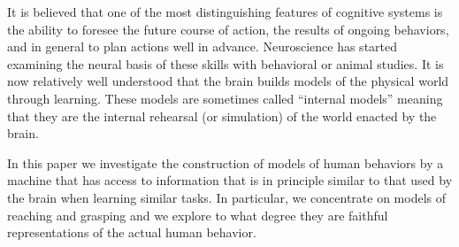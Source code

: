 It is believed that one of the most distinguishing features of cognitive
systems is the ability to foresee the future course of action, the results
of ongoing behaviors, and in general to plan actions well in advance.
Neuroscience has started examining the neural basis of these skills with 
behavioral or animal studies. It is now relatively well understood that
the brain builds models of the physical world through learning. These
models are sometimes called ``internal models'' meaning that they are
the internal rehearsal (or simulation) of the world enacted by the brain.

In this paper we investigate the construction of models of human behaviors
by a machine that has access to information that is in principle similar
to that used by the brain when learning similar tasks. In particular, we
concentrate on models of reaching and grasping and we explore to what degree
they are faithful representations of the actual human behavior.
